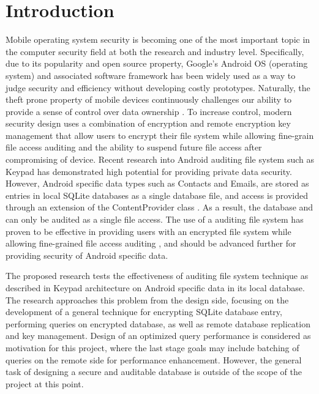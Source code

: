 \section{Introduction}\label{Intro}

Mobile operating system security is becoming one of the most important topic in the computer security field at both the research and industry level. Specifically, due to its popularity and open source property, Google’s Android OS (operating system) and associated software framework has been widely used as a way to judge security and efficiency without developing costly prototypes. Naturally, the theft prone property of mobile devices continuously challenges our ability to provide a sense of control over data ownership \cite{JAlex2008} \cite{Dagon2004}. To increase control, modern security design uses a combination of encryption and remote encryption key management that allow users to encrypt their file system while allowing fine-grain file access auditing and the ability to suspend future file access after compromising of device. Recent research into Android auditing file system such as Keypad \cite{Roxana2011} has demonstrated high potential for providing private data security. However, Android specific data types such as Contacts and Emails, are stored as entries in local SQLite databases as a single database file, and access is provided through an extension of the ContentProvider class \cite{contactPro}. As a result, the database and can only be audited as a single file access. The use of a auditing file system has proven to be effective in providing users with an encrypted file system while allowing fine-grained file access auditing \cite{Roxana2011}, and should be advanced further for providing security of Android specific data.

The proposed research tests the effectiveness of auditing file system technique as described in Keypad architecture on Android specific data in its local database. The research approaches this problem from the design side, focusing on the development of a general technique for encrypting SQLite database entry, performing queries on encrypted database, as well as remote database replication and key management. Design of an optimized query performance is considered as motivation for this project, where the last stage goals may include batching of queries on the remote side for performance enhancement. However, the general task of designing a secure and auditable database is outside of the scope of the project at this point.


